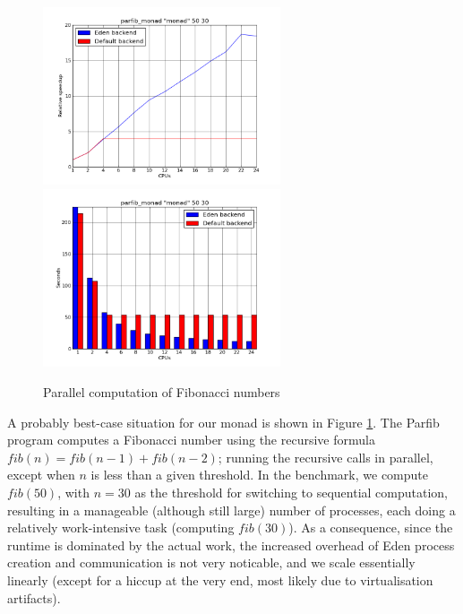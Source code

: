\documentclass[a4paper, oneside, final]{memoir}
\begin{document}
\begin{figure}
\caption{Parallel computation of Fibonacci numbers}
\label{fig:parfib}
\includegraphics[width=7cm]{parfib_monad-speedup.png}
\includegraphics[width=7cm]{parfib_monad-runtimes.png}
\end{figure}

A probably best-case situation for our monad is shown in Figure
\ref{fig:parfib}.  The Parfib program computes a Fibonacci number
using the recursive formula $fib(n) = fib(n-1) + fib(n-2)$; running
the recursive calls in parallel, except when $n$ is less than a given
threshold.  In the benchmark, we compute $fib(50)$, with $n=30$ as the
threshold for switching to sequential computation, resulting in a
manageable (although still large) number of processes, each doing a
relatively work-intensive task (computing $fib(30)$).  As a
consequence, since the runtime is dominated by the actual work, the
increased overhead of Eden process creation and communication is not
very noticable, and we scale essentially linearly (except for a hiccup
at the very end, most likely due to virtualisation artifacts).
\end{document}
